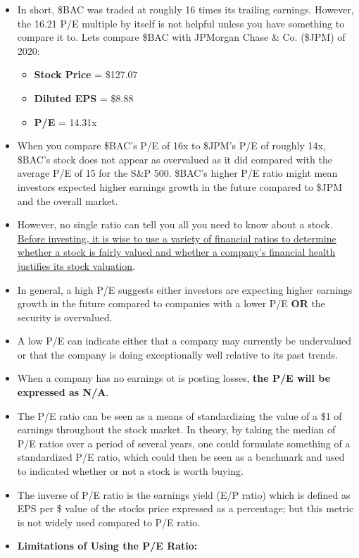 \documentclass{article}
\begin{document}
\begin{itemize}
\begin{itemize}
\begin{itemize}
						\item In short, \$BAC was traded at roughly 16 times its trailing earnings. However, the 16.21 P/E multiple by itself is not helpful unless you have something to compare it to. Lets compare \$BAC with JPMorgan Chase \& Co. (\$JPM) of 2020:
							\begin{itemize}
								\item {\bf Stock Price} = \$127.07
								\item {\bf Diluted EPS} = \$8.88
								\item {\bf P/E} = 14.31x
							\end{itemize}
						\item When you compare \$BAC's P/E of 16x to \$JPM's P/E of roughly 14x, \$BAC's stock does not appear as overvalued as it did compared with the average P/E of 15 for the S\&P 500. \$BAC's higher P/E ratio might mean investors expected higher earnings growth in the future compared to \$JPM and the overall market.
						\item However, no single ratio can tell you all you need to know about a stock. \underline{Before investing, it is wise to use a variety of financial ratios to determine whether a stock 
							is fairly valued and whether a company's financial health justifies its stock valuation}.
						\item In general, a high P/E suggests either investors are expecting higher earnings growth in the future compared to companies with a lower P/E {\bf OR} the security is overvalued.
						\item A low P/E can indicate either that a company may currently be undervalued or that the company is doing exceptionally well relative to its past trends.
						\item When a company has no earnings ot is posting losses, {\bf the P/E will be expressed as N/A}. 
						\item The P/E ratio can be seen as a means of standardizing the value of a \$1 of earnings throughout the stock market. In theory, by taking the median of P/E ratios over a period of several years, one could formulate something of a standardized P/E ratio, which could then be seen as a benchmark and used to indicated whether or not a stock is worth buying. 
						\item The inverse of P/E ratio is the earnings yield (E/P ratio) which is defined as EPS per \$ value of the stocks price expressed as a percentage; but this metric is not widely used compared to P/E ratio.
						\item {\bf Limitations of Using the P/E Ratio:}
					\end{itemize}
			\end{itemize}
	\end{itemize}
\end{document}
